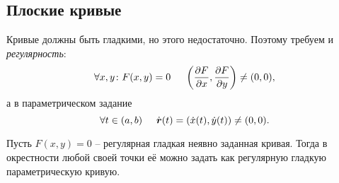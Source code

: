\subsection{Плоские кривые}
Кривые должны быть гладкими, но этого недостаточно. Поэтому требуем и \textit{регулярность}:
\begin{equation}
    \forall x, y \colon F(x, y) = 0
    \hspace{0.5cm} 
    \left(
        \frac{\partial F}{\partial x}, \frac{\partial F}{\partial y} 
    \right) \neq (0, 0),
\end{equation}
а в параметрическом задание
\begin{equation}
    \forall t \in (a, b)
    \hspace{0.5cm} 
    \dot{\mbox{\boldmath $r$}} (t) = (\dot{x} (t), \dot{y}(t)) \neq (0, 0).
\end{equation}

Пусть $F(x, y) = 0$ -- регулярная гладкая неявно заданная кривая. Тогда в окрестности любой своей точки её можно задать как регулярную гладкую параметрическую кривую. 




